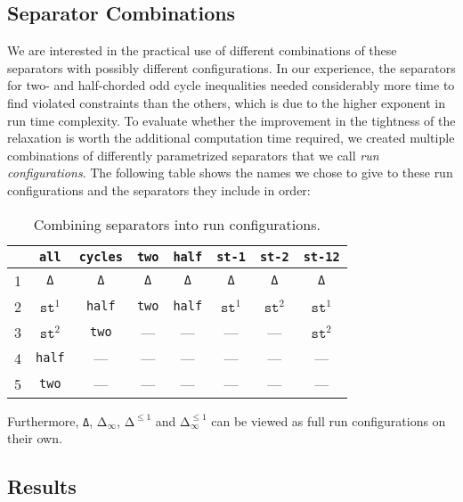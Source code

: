 \subsection{Separator Combinations}\label{subsec:separator_combinations}
We are interested in the practical use of different combinations of these separators with possibly different configurations.
In our experience, the separators for two- and half-chorded odd cycle inequalities needed considerably more time to find violated constraints than the others, which is due to the higher exponent in run time complexity.
To evaluate whether the improvement in the tightness of the relaxation is worth the additional computation time required, we created multiple combinations of differently parametrized separators that we call \textit{run configurations}.
The following table shows the names we chose to give to these run configurations and the separators they include in order:
\begin{table}[H]
	\centering
	\begin{tabular}{|l||c|c|c|c|c|c|c||}
		\hline
			& \texttt{all} 	& \texttt{cycles} & \texttt{two} & \texttt{half}	& \texttt{st-1} & \texttt{st-2} & \texttt{st-12} \\[0.5ex]
		\hline\hline
		1 	& \texttt{Δ} 	& \texttt{Δ} 				& \texttt{Δ} 	& \texttt{Δ} 		& \texttt{Δ} 	& \texttt{Δ} 	& \texttt{Δ} 	\\ 
		2 	& $\texttt{st}^{1}$ & \texttt{half} & \texttt{two} 			& \texttt{half} 				& $\texttt{st}^{1}$ 			& $\texttt{st}^{2}$  		& $\texttt{st}^{1}$			\\
		3 	& $\texttt{st}^{2}$			& \texttt{two} 						&--- &--- &---  			&--- & $\texttt{st}^{2}$			\\
		4 	& \texttt{half} &--- &---&---&---&---&---  \\
		5 	& \texttt{two}	&--- &---&---&---&---&---	\\
		\hline
	\end{tabular}
	\caption{Combining separators into run configurations.}
\end{table}
Furthermore, \texttt{Δ}, $\texttt{Δ}_{\infty}$, $\texttt{Δ}^{\leq 1}$ and $\texttt{Δ}_{\infty}^{\leq 1}$ can be viewed as full run configurations on their own.

\subsection{Results}\label{subsec:experiments_results}

